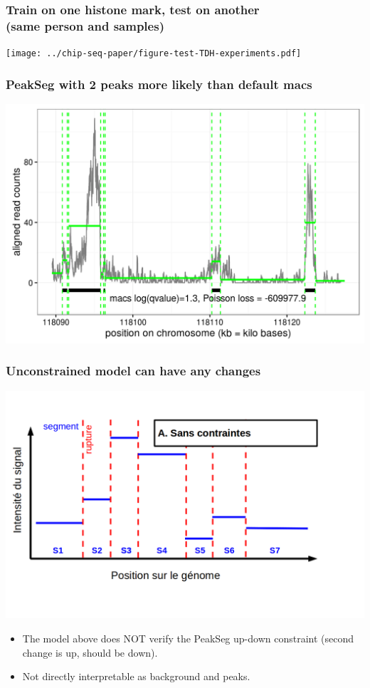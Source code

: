 \documentclass{beamer}
\begin{document}
\begin{frame}
  \frametitle{Train on one histone mark, test on another\\
(same person and samples)}
  \texttt{[image: ../chip-seq-paper/figure-test-TDH-experiments.pdf]}
\end{frame}


\begin{frame}
  \frametitle{PeakSeg with 2 peaks more likely than default macs}
  \includegraphics[width=1\textwidth]{figure-macs-problem-1-30103.png}
\end{frame}

\begin{frame}
  \frametitle{Unconstrained model can have any changes}
  \includegraphics[width=1\textwidth]{Seg_SansC.png}
  \vskip -1cm
  \begin{itemize}
  \item The model above does NOT verify the PeakSeg up-down constraint
    (second change is up, should be down).
  \item Not directly interpretable as background and peaks.
  \end{itemize}
\end{frame}
\end{document}
